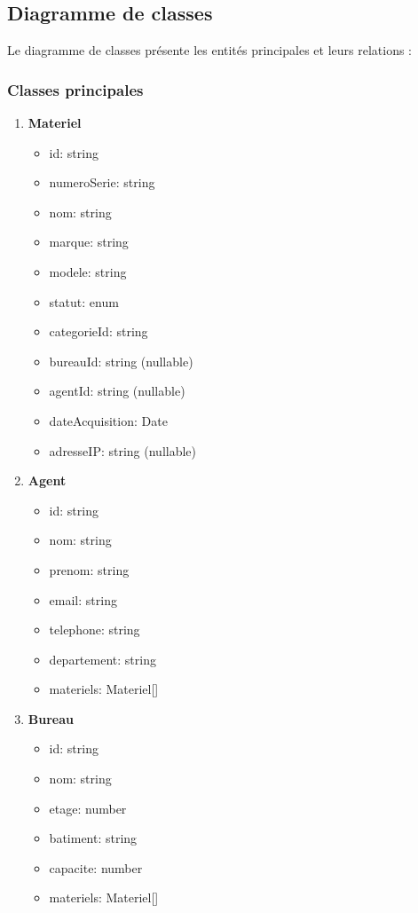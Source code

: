 \documentclass[12pt,a4paper]{report}
\begin{document}
\subsection{Diagramme de classes}

Le diagramme de classes présente les entités principales et leurs relations :

\subsubsection{Classes principales}

\begin{enumerate}
    \item \textbf{Materiel}
    \begin{itemize}
        \item id: string
        \item numeroSerie: string
        \item nom: string
        \item marque: string
        \item modele: string
        \item statut: enum
        \item categorieId: string
        \item bureauId: string (nullable)
        \item agentId: string (nullable)
        \item dateAcquisition: Date
        \item adresseIP: string (nullable)
    \end{itemize}
    
    \item \textbf{Agent}
    \begin{itemize}
        \item id: string
        \item nom: string
        \item prenom: string
        \item email: string
        \item telephone: string
        \item departement: string
        \item materiels: Materiel[]
    \end{itemize}
    
    \item \textbf{Bureau}
    \begin{itemize}
        \item id: string
        \item nom: string
        \item etage: number
        \item batiment: string
        \item capacite: number
        \item materiels: Materiel[]
    \end{itemize}
    

\end{enumerate}
\end{document}
